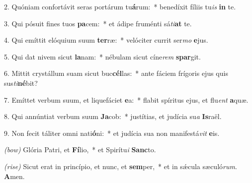 2. Quóniam confortávit seras portárum tu\textbf{á}rum:~* benedíxit fíliis tu\textit{is} \textbf{in} te.

3. Qui pósuit fines tuos \textbf{pa}cem:~* et ádipe fruménti sá\textit{ti}\textbf{at} te.

4. Qui emíttit elóquium suum \textbf{ter}ræ:~* velóciter currit ser\textit{mo} \textbf{e}jus.

5. Qui dat nivem sicut \textbf{la}nam:~* nébulam sicut cíne\textit{rem} \textbf{spar}git.

6. Mittit crystállum suam sicut buc\textbf{cél}las:~* ante fáciem frígoris ejus quis sus\textit{ti}\textbf{né}bit?

7. Emíttet verbum suum, et liquefáciet \textbf{e}a:~* flabit spíritus ejus, et flu\textit{ent} \textbf{a}quæ.

8. Qui annúntiat verbum suum \textbf{Ja}cob:~* justítias, et judícia su\textit{a} \textbf{Is}raël.

9. Non fecit táliter omni nati\textbf{ó}ni:~* et judícia sua non manifestá\textit{vit} \textbf{e}is.

\textit{(bow)} Glória Patri, et \textbf{Fí}lio,~* et Spirítu\textit{i} \textbf{Sanc}to.

\textit{(rise)} Sicut erat in princípio, et nunc, et \textbf{sem}per,~* et in s\'{\ae}cula sæculó\textit{rum}. \textbf{A}men.